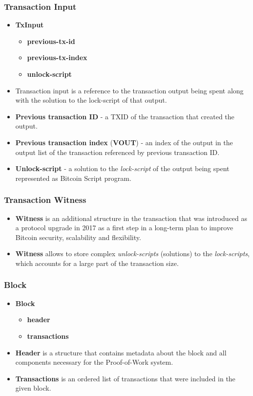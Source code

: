 \documentclass{beamer}
\begin{document}
\begin{frame}
  \frametitle{Transaction Input}
  \begin{itemize}
  \item \textbf{TxInput}
    \begin{itemize}
    \item \textbf{previous-tx-id}
    \item \textbf{previous-tx-index}
    \item \textbf{unlock-script}
    \end{itemize}
  \item Transaction input is a reference to the transaction output being spent
    along with the solution to the lock-script of that output.
  \item \textbf{Previous transaction ID} - a TXID of the transaction that
    created the output.
  \item \textbf{Previous transaction index} (\textbf{VOUT}) - an index of the
    output in the output list of the transaction referenced by previous
    transaction ID.
  \item \textbf{Unlock-script} - a solution to the \textit{lock-script} of the
    output being spent represented as Bitcoin Script program.
  \end{itemize}
\end{frame}

\begin{frame}
  \frametitle{Transaction Witness}
  \begin{itemize}
  \item \textbf{Witness} is an additional structure in the transaction that was
    introduced as a protocol upgrade in 2017 as a first step in a long-term plan
    to improve Bitcoin security, scalability and flexibility.
  \item \textbf{Witness} allows to store complex \textit{unlock-scripts}
    (solutions) to the \textit{lock-scripts}, which accounts for a large part of
    the transaction size.
  \end{itemize}
\end{frame}

\begin{frame}
  \frametitle{Block}
  \begin{itemize}
  \item \textbf{Block}
    \begin{itemize}
    \item \textbf{header}
    \item \textbf{transactions}
    \end{itemize}
  \item \textbf{Header} is a structure that contains metadata about the block
    and all components necessary for the Proof-of-Work system.
  \item \textbf{Transactions} is an ordered list of transactions that were
    included in the given block.
  \end{itemize}
\end{frame}
\end{document}
